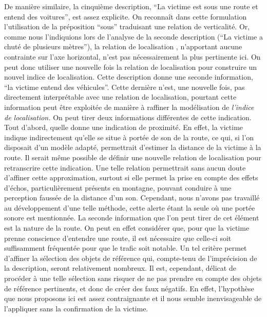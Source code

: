 De manière similaire, la cinquième description, \enquote{La victime
  est sous une route et entend des voitures}, est assez explicite. On
reconnaît dans cette formulation l'utilisation de la préposition
\enquote{sous} traduisant une relation de verticalité. Or, comme nous
l'indiquions lors de l'analyse de la seconde description (\enquote{La
  victime a chuté de plusieurs mètres}), la relation de localisation
, n'apportant aucune contrainte sur l'axe
horizontal, n'est pas nécessairement la plus pertinente ici. On peut
donc utiliser une nouvelle fois la relation de localisation
 pour construire un nouvel indice de
localisation. Cette description donne une seconde information,
\enquote{la victime entend des véhicules}. Cette dernière n'est, une
nouvelle fois, pas directement interprétable avec une relation de
localisation, pourtant cette information peut être exploitée de
manière à raffiner la modélisation de \emph{l'indice de localisation.}
On peut tirer deux informations différentes de cette indication. Tout
d'abord, quelle donne une indication de proximité. En effet, la
victime indique indirectement qu'elle se situe à portée de son de la
route, ce qui, si l'on disposait d'un modèle adapté, permettrait
d'estimer la distance de la victime à la route. Il serait même
possible de définir une nouvelle relation de localisation
 pour retranscrire cette indication. Une
telle relation permettrait sans aucun doute d'affiner cette
approximation, surtout si elle permet la prise en compte des effets
d’échos, particulièrement présents en montagne, pouvant conduire à une
perception faussée de la distance d'un son. Cependant, nous n'avons
pas travaillé au développement d'une telle méthode, cette alerte étant
la seule où une portée sonore est mentionnée. La seconde information
que l'on peut tirer de cet élément est la nature de la route. On peut
en effet considérer que, pour que la victime prenne conscience
d'entendre une route, il est nécessaire que celle-ci soit suffisamment
fréquentée pour que le trafic soit notable. Un tel critère permet
d'affiner la sélection des objets de référence qui, compte-tenu de
l’imprécision de la description, seront relativement nombreux. Il est,
cependant, délicat de procéder à une telle sélection sans risquer de
ne pas prendre en compte des objets de référence pertinents, et donc
de créer des faux négatifs. En effet, l'hypothèse que nous proposons
ici est assez contraignante et il nous semble inenvisageable de
l'appliquer sans la confirmation de la victime.

